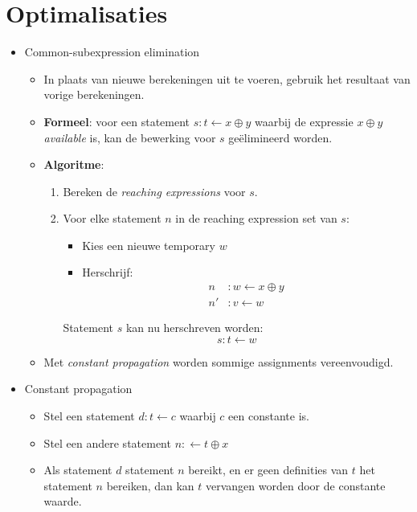 \section{Optimalisaties}
\begin{itemize}
	\item Common-subexpression elimination
	\begin{itemize}
		\item In plaats van nieuwe berekeningen uit te voeren, gebruik het resultaat van vorige berekeningen.
		\item \textbf{Formeel}: voor een statement $s : t \leftarrow x \oplus y$ waarbij de expressie $x \oplus y$ \textit{available} is, kan de bewerking voor $s$ geëlimineerd worden.
		\item \textbf{Algoritme}:
		\begin{enumerate}
			\item Bereken de \textit{reaching expressions} voor $s$.
			\item Voor elke statement $n$ in de reaching expression set van $s$:
			\begin{itemize}
				\item Kies een nieuwe temporary $w$
				\item Herschrijf:
				\begin{align*}
					n  & : w \leftarrow x \oplus y \\
					n' & : v \leftarrow w
				\end{align*}
			\end{itemize}
			Statement $s$ kan nu herschreven worden:
			$$s : t \leftarrow w$$
		\end{enumerate}
		\item Met \textit{constant propagation} worden sommige assignments vereenvoudigd.
	\end{itemize}
	\item Constant propagation
	\begin{itemize}
		\item Stel een statement $d : t \leftarrow c$ waarbij $c$ een constante is.
		\item Stel een andere statement $n : \leftarrow t \oplus x$
		\item Als statement $d$ statement $n$ bereikt, en er geen definities van $t$ het statement $n$ bereiken, dan kan $t$ vervangen worden door de constante waarde.


\end{itemize}
\end{itemize}
